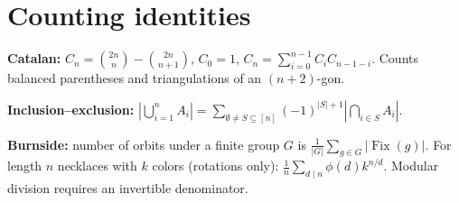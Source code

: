 \section{Counting identities}
\textbf{Catalan:} $C_n=\binom{2n}{n}-\binom{2n}{n+1}$,
$C_0=1$, $C_n=\sum_{i=0}^{n-1}C_i C_{n-1-i}$.
Counts balanced parentheses and triangulations of an $(n+2)$-gon.

\textbf{Inclusion--exclusion:}
$|\bigcup_{i=1}^n A_i|=\sum_{\emptyset\ne S\subseteq[n]}
(-1)^{|S|+1}|\bigcap_{i\in S}A_i|$.

\textbf{Burnside:} number of orbits under a finite group $G$ is
$\frac{1}{|G|}\sum_{g\in G}|\operatorname{Fix}(g)|$.
For length $n$ necklaces with $k$ colors (rotations only):
$\frac1n\sum_{d\mid n}\phi(d)k^{n/d}$.
Modular division requires an invertible denominator.
